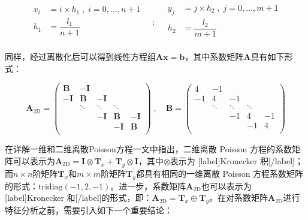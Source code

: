 \documentclass[12pt, UTF8, nofonts]{ctexart}
\begin{document}
\[
  \begin{aligned}
    x_i &= i \times h_1 \;,\; i=0,\ldots,n+1 \\
    h_1 &= \dfrac{l_1}{n+1} \\
  \end{aligned}
  \quad;\quad
  \begin{aligned}
    y_j &= j \times h_2 \;,\; j=0,\ldots,m+1 \\
    h_2 &= \dfrac{l_2}{m+1} \\
  \end{aligned}
\]

同样，经过离散化后可以得到线性方程组$\boldsymbol{Ax}=\boldsymbol{b}$，其中系数矩阵$\boldsymbol{A}$具有如下形式：

\begin{equation*}
  \boldsymbol{A}_{\mathrm{2D}} =
  \begin{pmatrix}
    \boldsymbol{B} & -\boldsymbol{I} & & & \\
    -\boldsymbol{I} & \boldsymbol{B} & -\boldsymbol{I} & & \\
    & \ddots & \ddots & \ddots & \\
    & & -\boldsymbol{I} & \boldsymbol{B} & -\boldsymbol{I} \\
    & & & -\boldsymbol{I} & \boldsymbol{B} \\
  \end{pmatrix} \;,\quad
  \boldsymbol{B} =
  \begin{pmatrix}
    4 & -1 & & & \\
    -1 & 4 & -1 & & \\
    & \ddots & \ddots & \ddots & \\
    & & -1 & 4 & -1 \\
    & & & -1 & 4 \\
  \end{pmatrix}
\end{equation*}

在详解一维和二维离散Poisson方程一文中指出，二维离散 Poisson 方程的系数矩阵可以表示为$\boldsymbol{A}_{\mathrm{2D}}=\boldsymbol{I}\otimes\boldsymbol{T}_x+\boldsymbol{T}_y\otimes\boldsymbol{I}$，其中$\otimes$表示为 [label]Kronecker 积[/label]；而$n \times n$阶矩阵$\boldsymbol{T}_x$和$m \times m$阶矩阵$\boldsymbol{T}_y$都具有相同的一维离散 Poisson 方程系数矩阵的形式：$\mathrm{tridiag}(-1,2,-1)$。进一步，系数矩阵$\boldsymbol{A}_{\mathrm{2D}}$也可以表示为 [label]Kronecker 和[/label]的形式，即：$\boldsymbol{A}_{\mathrm{2D}}=\boldsymbol{T}_x \oplus \boldsymbol{T}_y$。在对系数矩阵$\boldsymbol{A}_{\mathrm{2D}}$进行特征分析之前，需要引入如下一个重要结论：
\end{document}
